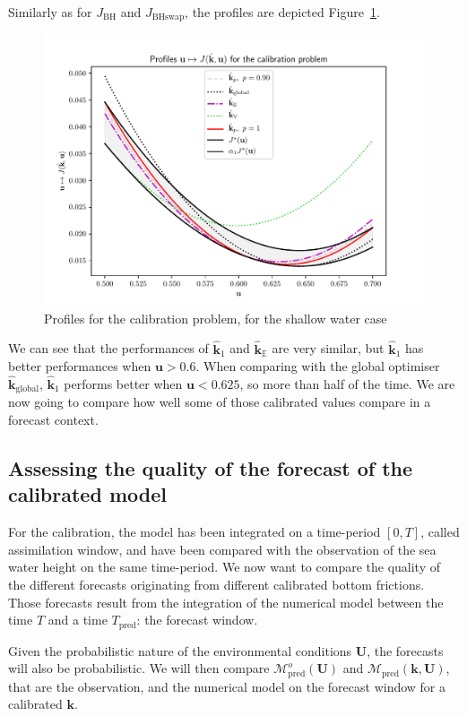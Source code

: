 \documentclass[preprint, 1p]{elsarticle}
\newcommand{\Ex}{\mathbb{E}}
\newcommand{\hatkmean}{\hat{\mathbf{k}}_{\Ex}}
\newcommand{\kest}{\hat{\mathbf{k}}}
\newcommand{\JBH}{J_{\mathrm{BH}}}
\newcommand{\JBHS}{J_{\mathrm{BHswap}}}
\newlength{\onehalfcolumn}
\begin{document}
Similarly as for $\JBH$ and $\JBHS$, the profiles are depicted Figure~\ref{fig:profiles_swe}.
\begin{figure}[!h]
  \centering
  \includegraphics[width=\onehalfcolumn]{Figures/FIG12}
  \caption{Profiles for the calibration problem, for the shallow water case}
\label{fig:profiles_swe}
\end{figure}


We can see that the performances of $\kest_1$ and $\hatkmean$ are very similar, but $\kest_1$ has better performances when $\mathbf{u} > 0.6$. When comparing with the global optimiser $\kest_{\mathrm{global}}$, $\kest_1$ performs better when $\mathbf{u}<0.625$, so more than half of the time.
We are now going to compare how well some of those calibrated values compare in a forecast context.


\subsection{Assessing the quality of the forecast of the calibrated model}
For the calibration, the model has been integrated on a time-period $[0, T]$, called assimilation window, and have been compared with the observation of the sea water height on the same time-period.
We now want to compare the quality of the different forecasts originating from different calibrated bottom frictions.
Those forecasts result from the integration of the numerical model between the time $T$ and a time $T_{\mathrm{pred}}$: the forecast window.

Given the probabilistic nature of the environmental conditions $\mathbf{U}$, the forecasts will also be probabilistic. We will then compare $\mathcal{M}_{\mathrm{pred}}^o(\mathbf{U})$ and $\mathcal{M}_{\mathrm{pred}}(\mathbf{k},\mathbf{U})$, that are the observation, and the numerical model on the forecast window for a calibrated $\mathbf{k}$.
\end{document}
